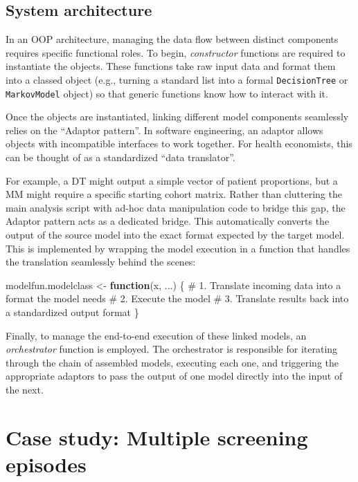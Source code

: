 \documentclass[
]{article}
\newenvironment{Shaded}{\begin{snugshade}}{\end{snugshade}}
\newcommand{\CommentTok}[1]{\textcolor[rgb]{0.37,0.37,0.37}{#1}}
\newcommand{\ControlFlowTok}[1]{\textcolor[rgb]{0.00,0.23,0.31}{\textbf{#1}}}
\newcommand{\NormalTok}[1]{\textcolor[rgb]{0.00,0.23,0.31}{#1}}
\newcommand{\OtherTok}[1]{\textcolor[rgb]{0.00,0.23,0.31}{#1}}
\begin{document}
\subsection{System architecture}\label{system-architecture}

In an OOP architecture, managing the data flow between distinct
components requires specific functional roles. To begin,
\emph{constructor} functions are required to instantiate the objects.
These functions take raw input data and format them into a classed
object (e.g., turning a standard list into a formal
\texttt{DecisionTree} or \texttt{MarkovModel} object) so that generic
functions know how to interact with it.

Once the objects are instantiated, linking different model components
seamlessly relies on the ``Adaptor pattern''. In software engineering,
an adaptor allows objects with incompatible interfaces to work together.
For health economists, this can be thought of as a standardized ``data
translator''.

For example, a DT might output a simple vector of patient proportions,
but a MM might require a specific starting cohort matrix. Rather than
cluttering the main analysis script with ad-hoc data manipulation code
to bridge this gap, the Adaptor pattern acts as a dedicated bridge. This
automatically converts the output of the source model into the exact
format expected by the target model. This is implemented by wrapping the
model execution in a function that handles the translation seamlessly
behind the scenes:

\begin{Shaded}
\begin{Highlighting}[]
\NormalTok{modelfun.modelclass }\OtherTok{\textless{}{-}} \ControlFlowTok{function}\NormalTok{(x, ...) \{}
\CommentTok{\# 1. Translate incoming data into a format the model needs}
\CommentTok{\# 2. Execute the model}
\CommentTok{\# 3. Translate results back into a standardized output format}
\NormalTok{\}}
\end{Highlighting}
\end{Shaded}

Finally, to manage the end-to-end execution of these linked models, an
\emph{orchestrator} function is employed. The orchestrator is
responsible for iterating through the chain of assembled models,
executing each one, and triggering the appropriate adaptors to pass the
output of one model directly into the input of the next.

\section{Case study: Multiple screening
episodes}\label{case-study-multiple-screening-episodes}
\end{document}
